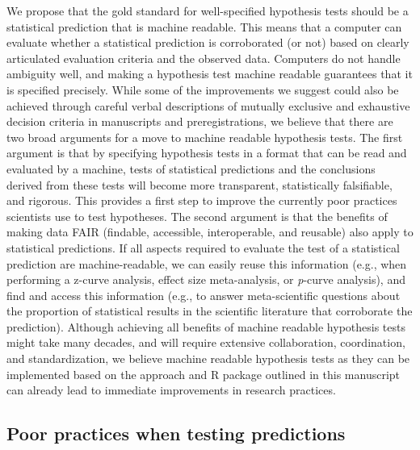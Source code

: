 \documentclass[
  english,
  doc,floatsintext]{apa6}
\begin{document}
We propose that the gold standard for well-specified hypothesis tests should be a statistical prediction that is machine readable. This means that a computer can evaluate whether a statistical prediction is corroborated (or not) based on clearly articulated evaluation criteria and the observed data. Computers do not handle ambiguity well, and making a hypothesis test machine readable guarantees that it is specified precisely. While some of the improvements we suggest could also be achieved through careful verbal descriptions of mutually exclusive and exhaustive decision criteria in manuscripts and preregistrations, we believe that there are two broad arguments for a move to machine readable hypothesis tests. The first argument is that by specifying hypothesis tests in a format that can be read and evaluated by a machine, tests of statistical predictions and the conclusions derived from these tests will become more transparent, statistically falsifiable, and rigorous. This provides a first step to improve the currently poor practices scientists use to test hypotheses. The second argument is that the benefits of making data FAIR (findable, accessible, interoperable, and reusable) also apply to statistical predictions. If all aspects required to evaluate the test of a statistical prediction are machine-readable, we can easily reuse this information (e.g., when performing a z-curve analysis, effect size meta-analysis, or \emph{p}-curve analysis), and find and access this information (e.g., to answer meta-scientific questions about the proportion of statistical results in the scientific literature that corroborate the prediction). Although achieving all benefits of machine readable hypothesis tests might take many decades, and will require extensive collaboration, coordination, and standardization, we believe machine readable hypothesis tests as they can be implemented based on the approach and R package outlined in this manuscript can already lead to immediate improvements in research practices.

\hypertarget{poor-practices-when-testing-predictions}{%
\subsection{Poor practices when testing predictions}\label{poor-practices-when-testing-predictions}}
\end{document}
